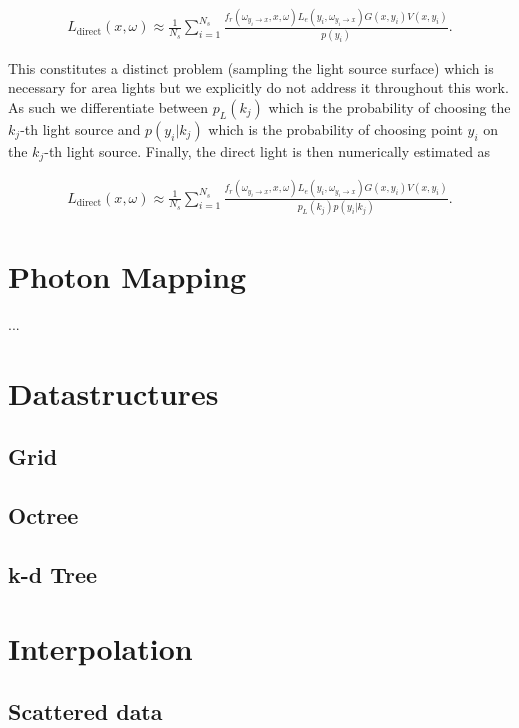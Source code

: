 \begin{align}
L_{\text{direct}}(x, \omega) \approx \frac{1}{N_s} \sum_{i=1}^{N_s} \frac{f_r(\omega_{y_i \rightarrow x}, x, \omega) L_e(y_i, \omega_{y_i \rightarrow x}) G(x,y_i)V(x,y_i)}{p(y_i)}.
\end{align}

This constitutes a distinct problem (sampling the light source surface) which is necessary for area lights but we explicitly do not address it throughout this work. As such we differentiate between $p_L(k_j)$ which is the probability of choosing the $k_j$-th light source and $p(y_i|k_j)$ which is the probability of choosing point $y_i$ on the $k_j$-th light source. Finally, the direct light is then numerically estimated as

\begin{align}
L_{\text{direct}}(x, \omega) \approx \frac{1}{N_s} \sum_{i=1}^{N_s} \frac{f_r(\omega_{y_i \rightarrow x}, x, \omega) L_e(y_i, \omega_{y_i \rightarrow x}) G(x,y_i)V(x,y_i)}{p_L(k_j)p(y_i|k_j)}.
\end{align}


\section{Photon Mapping}
\label{sec:PM}
...
\section{Datastructures}
\subsection{Grid}
\subsection{Octree}
\subsection{k-d Tree}


\section{Interpolation}
\subsection{Scattered data}
